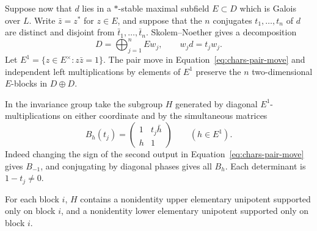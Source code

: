 Suppose now that $d$ lies in a $*$-stable maximal subfield $E\subset D$
which is Galois over $L$. Write $\bar z=z^*$ for $z\in E$, and suppose
that the $n$ conjugates $t_1,\ldots,t_n$ of $d$ are distinct and disjoint
from $\bar t_1,\ldots,\bar t_n$. Skolem--Noether gives a decomposition
\[
 D=\bigoplus_{j=1}^n E w_j,\qquad w_jd=t_jw_j.
\]
Let $E^1=\{z\in E^\times:z\bar z=1\}$. The pair move in
Equation~\ref{eq:chars-pair-move} and independent left multiplications
by elements of $E^1$ preserve the $n$ two-dimensional $E$-blocks in
$D\oplus D$.

In the invariance group take the subgroup $H$ generated by diagonal
$E^1$-multiplications on either coordinate and by the simultaneous matrices
\begin{equation}\label{eq:chars-boosts}
 B_h(t_j)=\begin{pmatrix}1&t_j\bar h\\h&1\end{pmatrix}
 \qquad(h\in E^1).
\end{equation}
Indeed changing the sign of the second output in
Equation~\ref{eq:chars-pair-move} gives $B_{-1}$, and conjugating by
diagonal phases gives all $B_h$. Each determinant is $1-t_j\ne0$.

\begin{lemma}\label{lem:chars-pure-shears}
For each block $i$, $H$ contains a nonidentity upper elementary
unipotent supported only on block $i$, and a nonidentity lower
elementary unipotent supported only on block $i$.
\end{lemma}

